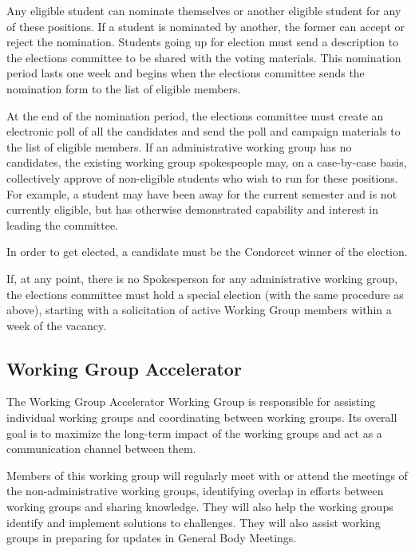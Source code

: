 \documentclass{article}
\begin{document}
Any eligible student can nominate themselves or another eligible student for any of these positions. If a student is nominated by another, the former can accept or reject the nomination. Students going up for election must send a description to the elections committee to be shared with the voting materials. This nomination period lasts one week and begins when the elections committee sends the nomination form to the list of eligible members. 


At the end of the nomination period, the elections committee must create an electronic poll of all the candidates and send the poll and campaign materials to the list of eligible members.
If an administrative working group has no candidates, the existing working group spokespeople may, on a case-by-case basis, collectively approve of non-eligible students who wish to run for these positions.
For example, a student may have been away for the current semester and is not currently eligible, but has otherwise demonstrated capability and interest in leading the committee.

In order to get elected, a candidate must be the Condorcet winner of the election. 

If, at any point, there is no Spokesperson for any administrative working group, the elections committee must hold a special election (with the same procedure as above), starting with a solicitation of active Working Group members within a week of the vacancy.

\subsection{Working Group Accelerator}

The Working Group Accelerator Working Group is responsible for assisting individual working groups and coordinating between working groups. Its overall goal is to maximize the long-term impact of the working groups and act as a communication channel between them.

Members of this working group will regularly meet with or attend the meetings of the non-administrative working groups, identifying overlap in efforts between working groups and sharing knowledge. They will also help the working groups identify and implement solutions to challenges. They will also assist working groups in preparing for updates in General Body Meetings.



\end{document}
